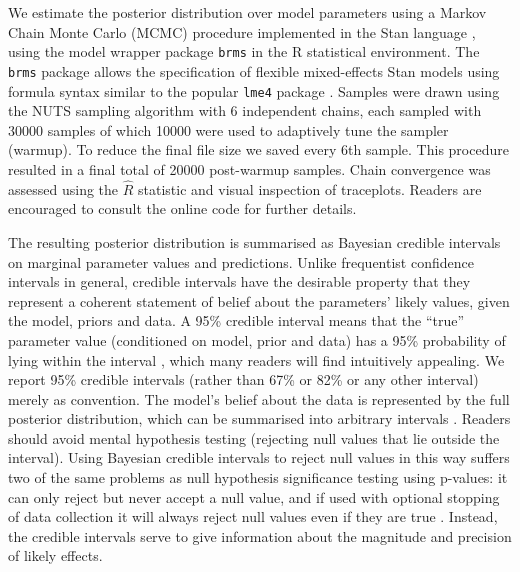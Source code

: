 \documentclass[doc, 11pt,a4paper,natbib]{apa6}\usepackage[]{graphicx}\usepackage[]{color}
\begin{document}
We estimate the posterior distribution over model parameters using a Markov Chain Monte Carlo (MCMC) procedure implemented in the Stan language \citep[version 2.15.1;][]{standevelopmentteam_stan_2015, hoffman_nouturn_2014}, using the model wrapper package \texttt{brms} \citep[version 1.7.0;][]{burkner_brms:_????-1} in the R statistical environment.
The \texttt{brms} package allows the specification of flexible mixed-effects Stan models using formula syntax similar to the popular \texttt{lme4} package \citep{bates_fitting_2015}.
Samples were drawn using the NUTS sampling algorithm \citep{hoffman_nouturn_2014} with 6 independent chains, each sampled with 30000 samples of which 10000 were used to adaptively tune the sampler (warmup).
To reduce the final file size we saved every 6th sample.
This procedure resulted in a final total of 20000 post-warmup samples.
Chain convergence was assessed using the $\hat R$ statistic \citep{gelman_inference_1992} and visual inspection of traceplots.
Readers are encouraged to consult the online code for further details.

The resulting posterior distribution is summarised as Bayesian credible intervals on marginal parameter values and predictions.
Unlike frequentist confidence intervals in general, credible intervals have the desirable property that they represent a coherent statement of belief about the parameters' likely values, given the model, priors and data.
A 95\% credible interval means that the ``true'' parameter value (conditioned on model, prior and data) has a 95\% probability of lying within the interval \citep[see][for recent discussion on this issue]{morey_fallacy_2015, miller_interpreting_2015,morey_continued_2015}, which many readers will find intuitively appealing.
We report 95\% credible intervals (rather than 67\% or 82\% or any other interval) merely as convention.
The model's belief about the data is represented by the full posterior distribution, which can be summarised into arbitrary intervals \citep[see][p.58 for related discussion]{mcelreath_statistical_2016}.
Readers should avoid mental hypothesis testing (rejecting null values that lie outside the interval).
Using Bayesian credible intervals to reject null values in this way suffers two of the same problems as null hypothesis significance testing using p-values: it can only reject but never accept a null value, and if used with optional stopping of data collection it will always reject null values even if they are true \citep{kruschke_bayesian_2017}.
Instead, the credible intervals serve to give information about the magnitude and precision of likely effects.
\end{document}
